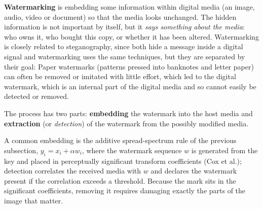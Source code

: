 \textbf{Watermarking} is embedding some information within digital media (an image, audio, video or document) so that the media looks unchanged. The hidden information is not important by itself, but it \emph{says something about the media}: who owns it, who bought this copy, or whether it has been altered. Watermarking is closely related to steganography, since both hide a message inside a digital signal and watermarking uses the same techniques, but they are separated by their goal:  Paper watermarks (patterns pressed into banknotes and letter paper) can often be removed or imitated with little effort, which led to the digital watermark, which is an internal part of the digital media and so cannot easily be detected or removed.

The process has two parts: \textbf{embedding} the watermark into the host media and \textbf{extraction} (or \emph{detection}) of the watermark from the possibly modified media.
\begin{center}
\end{center}
A common embedding is the additive spread-spectrum rule of the previous subsection, $y_i = x_i + \alpha w_i$, where the watermark sequence $w$ is generated from the key and placed in perceptually significant transform coefficients (Cox et al.); detection correlates the received media with $w$ and declares the watermark present if the correlation exceeds a threshold. Because the mark sits in the significant coefficients, removing it requires damaging exactly the parts of the image that matter.

